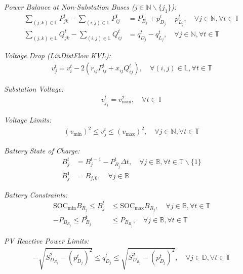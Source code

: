 \textit{Power Balance at Non-Substation Buses ($j \in \mathbb{N} \backslash \{j_1\}$):}
\begin{align}
    \sum_{(j, k) \in \mathbb{L}} P_{jk}^t - \sum_{(i, j) \in \mathbb{L}} P_{ij}^t &= P_{B_j}^t + p_{D_j}^t - p_{L_j}^t, \quad \forall j \in \mathbb{N} , \forall t \in \mathbb{T} \label{eq:node_real} \\
    \sum_{(j, k) \in \mathbb{L}} Q_{jk}^t - \sum_{(i, j) \in \mathbb{L}} Q_{ij}^t &= q_{D_j}^t - q_{L_j}^t, \quad \forall j \in \mathbb{N} , \forall t \in \mathbb{T} \label{eq:node_reactive}
\end{align}

\textit{Voltage Drop (LinDistFlow KVL):}
\begin{align}
    v_j^t = v_i^t - 2(r_{ij}P_{ij}^t + x_{ij}Q_{ij}^t), \quad \forall (i,j) \in \mathbb{L}, \forall t \in \mathbb{T} \label{eq:kvl}
\end{align}

\textit{Substation Voltage:}
\begin{align}
    v_{j_1}^t = v_{\text{nom}}^2, \quad \forall t \in \mathbb{T} \label{eq:subs_voltage}
\end{align}

\textit{Voltage Limits:}
\begin{align}
    (v_{\min})^2 \leq v_j^t \leq (v_{\max})^2, \quad \forall j \in \mathbb{N}, \forall t \in \mathbb{T} \label{eq:voltage_limits}
\end{align}

\textit{Battery State of Charge:}
\begin{align}
    B_j^t &= B_j^{t-1} - P_{B_j}^t \Delta t, \quad \forall j \in \mathbb{B}, \forall t \in \mathbb{T} \backslash \{1\} \label{eq:battery_soc} \\
    B_j^1 &= B_{j,0}, \quad \forall j \in \mathbb{B} \label{eq:battery_init}
\end{align}

\textit{Battery Constraints:}
\begin{align}
    \text{SOC}_{\min} B_{R_j} \leq B_j^t &\leq \text{SOC}_{\max} B_{R_j}, \quad \forall j \in \mathbb{B}, \forall t \in \mathbb{T} \label{eq:battery_soc_limits} \\
    -P_{B_{R_j}} \leq P_{B_j}^t &\leq P_{B_{R_j}}, \quad \forall j \in \mathbb{B}, \forall t \in \mathbb{T} \label{eq:battery_power_limits}
\end{align}

\textit{PV Reactive Power Limits:}
\begin{align}
    -\sqrt{S_{D_{R_j}}^2 - (p_{D_j}^t)^2} \leq q_{D_j}^t \leq \sqrt{S_{D_{R_j}}^2 - (p_{D_j}^t)^2}, \quad \forall j \in \mathbb{D}, \forall t \in \mathbb{T} \label{eq:pv_reactive}
\end{align}

